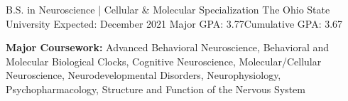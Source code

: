 

\begin{cventries}

  \cventry
    {B.S. in Neuroscience | Cellular \& Molecular Specialization} %
    {The Ohio State University} %
    {Expected: December 2021} %
    {Major GPA: 3.77{\enskip\cdotp\enskip}Cumulative GPA: 3.67} %
    {
      \begin{cvitems} %
        \item {\textbf{Major Coursework:} Advanced Behavioral Neuroscience, Behavioral and Molecular Biological Clocks, Cognitive Neuroscience, Molecular/Cellular Neuroscience, Neurodevelopmental Disorders, Neurophysiology, Psychopharmacology, Structure and Function of the Nervous System}
      \end{cvitems}
    }

\end{cventries}